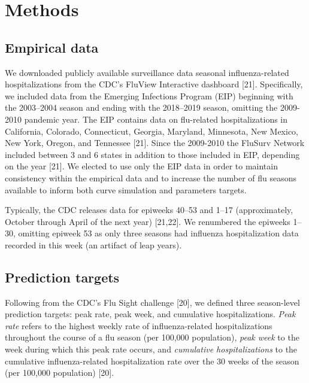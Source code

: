 \documentclass[10pt,letterpaper]{article}
\begin{document}
\hypertarget{methods}{%
\section{Methods}\label{methods}}

\hypertarget{empirical-data}{%
\subsection{Empirical data}\label{empirical-data}}

We downloaded publicly available surveillance data seasonal
influenza-related hospitalizations from the CDC's FluView Interactive
dashboard {[}21{]}. Specifically, we included data from the Emerging
Infections Program (EIP) beginning with the 2003--2004 season and ending
with the 2018--2019 season, omitting the 2009-2010 pandemic year. The
EIP contains data on flu-related hospitalizations in California,
Colorado, Connecticut, Georgia, Maryland, Minnesota, New Mexico, New
York, Oregon, and Tennessee {[}21{]}. Since the 2009-2010 the FluSurv
Network included between 3 and 6 states in addition to those included in
EIP, depending on the year {[}21{]}. We elected to use only the EIP data
in order to maintain consistency within the empirical data and to
increase the number of flu seasons available to inform both curve
simulation and parameters targets.

Typically, the CDC releases data for epiweeks 40--53 and 1--17
(approximately, October through April of the next year) {[}21,22{]}. We
renumbered the epiweeks 1--30, omitting epiweek 53 as only three seasons
had influenza hospitalization data recorded in this week (an artifact of
leap years).

\hypertarget{prediction-targets}{%
\subsection{Prediction targets}\label{prediction-targets}}

Following from the CDC's Flu Sight challenge {[}20{]}, we defined three
season-level prediction targets: peak rate, peak week, and cumulative
hospitalizations. \emph{Peak rate} refers to the highest weekly rate of
influenza-related hospitalizations throughout the course of a flu season
(per 100,000 population), \emph{peak week} to the week during which this
peak rate occurs, and \emph{cumulative hospitalizations} to the
cumulative influenza-related hospitalization rate over the 30 weeks of
the season (per 100,000 population) {[}20{]}.
\end{document}
